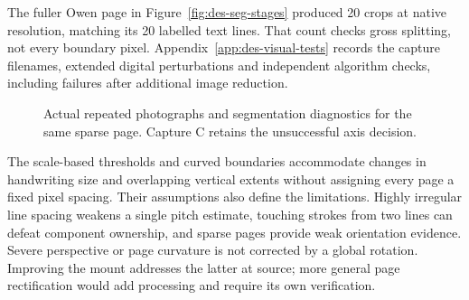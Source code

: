 The fuller Owen page in Figure~\ref{fig:des-seg-stages} produced 20 crops at native resolution, matching its 20 labelled text lines. That count checks gross splitting, not every boundary pixel. Appendix~\ref{app:des-visual-tests} records the capture filenames, extended digital perturbations and independent algorithm checks, including failures after additional image reduction.~\cite[segment.py]{braunepipeline2026}


\begin{figure}[!htbp]\centering
{}
\caption{Actual repeated photographs and segmentation diagnostics for the same sparse page. Capture C retains the unsuccessful axis decision.~\cite{brauneevidence2026,braunepipeline2026}}
\label{fig:des-seg-variation}
\end{figure}

The scale-based thresholds and curved boundaries accommodate changes in handwriting size and overlapping vertical extents without assigning every page a fixed pixel spacing. Their assumptions also define the limitations. Highly irregular line spacing weakens a single pitch estimate, touching strokes from two lines can defeat component ownership, and sparse pages provide weak orientation evidence. Severe perspective or page curvature is not corrected by a global rotation. Improving the mount addresses the latter at source; more general page rectification would add processing and require its own verification.~\cite[segment.py]{braunepipeline2026}
\FloatBarrier
